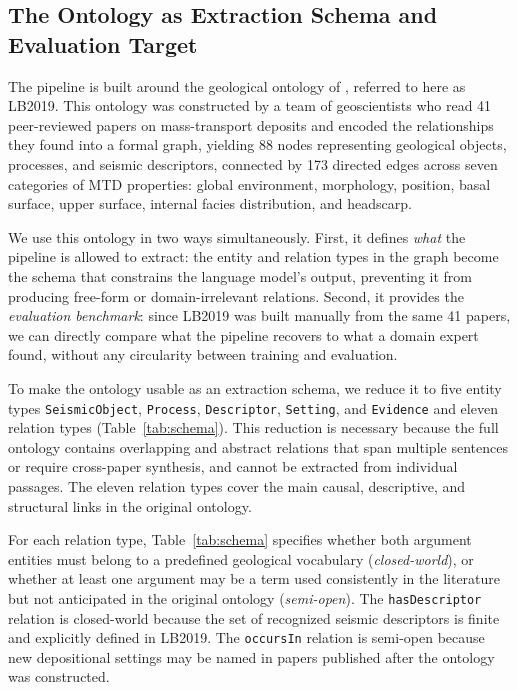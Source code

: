 \documentclass[10pt]{article}
\newcommand{\pred}[1]{\texttt{\small #1}}
\begin{document}
\subsection{The Ontology as Extraction Schema and Evaluation
Target}
\label{sec:ontology}

The pipeline is built around the geological ontology of
\citet{LEBOUTEILLER2019438}, referred to here as LB2019.
This ontology was constructed by a team of geoscientists who
read 41 peer-reviewed papers on mass-transport deposits and
encoded the relationships they found into a formal graph,
yielding 88 nodes representing geological objects, processes,
and seismic descriptors, connected by 173 directed edges across
seven categories of MTD properties: global environment,
morphology, position, basal surface, upper surface, internal
facies distribution, and headscarp.

We use this ontology in two ways simultaneously.
First, it defines \emph{what} the pipeline is allowed to
extract: the entity and relation types in the graph become the
schema that constrains the language model's output, preventing
it from producing free-form or domain-irrelevant relations.
Second, it provides the \emph{evaluation benchmark}: since
LB2019 was built manually from the same 41 papers, we can
directly compare what the pipeline recovers to what a domain
expert found, without any circularity between training and
evaluation.

To make the ontology usable as an extraction schema, we reduce
it to five entity types  \pred{SeismicObject},
\pred{Process}, \pred{Descriptor}, \pred{Setting}, and
\pred{Evidence}  and eleven relation types
(Table~\ref{tab:schema}).
This reduction is necessary because the full ontology contains
overlapping and abstract relations that span multiple sentences
or require cross-paper synthesis, and cannot be extracted
from individual passages.
The eleven relation types cover the main causal, descriptive,
and structural links in the original ontology.

For each relation type, Table~\ref{tab:schema} specifies
whether both argument entities must belong to a predefined
geological vocabulary (\emph{closed-world}), or whether at
least one argument may be a term used consistently in the
literature but not anticipated in the original ontology
(\emph{semi-open}).
The \pred{hasDescriptor} relation is closed-world because the
set of recognized seismic descriptors is finite and explicitly
defined in LB2019.
The \pred{occursIn} relation is semi-open because new
depositional settings may be named in papers published after
the ontology was constructed.
\end{document}
